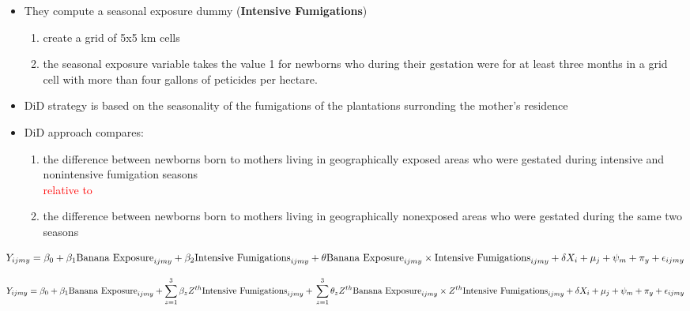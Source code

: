 \documentclass[hyperref={pdfpagelabels=false}]{beamer}
\begin{document}
	\begin{frame}{}
		\begin{itemize}
			\justifying
			\item They compute a seasonal exposure dummy (\textcolor{myblue}{\textbf{Intensive Fumigations}})
			\begin{enumerate}
				\justifying
				\item create a grid of 5x5 km cells
				\item the seasonal exposure variable takes the value 1 for newborns who during their gestation were for at least three months in a grid cell with more than four gallons of peticides per hectare.
			\end{enumerate}
			\item DiD strategy is based on the seasonality of the fumigations of the plantations surronding the mother's residence
			\vspace{2mm}
			\item DiD approach compares:
			\begin{enumerate}
				\justifying
				\item  the difference between newborns born to mothers living in geographically exposed areas who were gestated during intensive and nonintensive fumigation seasons \\
				\textcolor{red}{relative to}
				\item the difference between newborns born to mothers living in geographically nonexposed areas who were gestated during the same two seasons
			\end{enumerate}
		\end{itemize}
	\end{frame}
	
	\begin{frame}{}
		\begin{equation}
			Y_{ijmy} = \beta_{0} + \beta_{1}\text{Banana Exposure}_{ijmy} + \beta_{2}\text{Intensive Fumigations}_{ijmy} + \\ \theta \text{Banana Exposure}_{ijmy} \times \text{Intensive Fumigations}_{ijmy} + \\ \vspace{2mm} \delta X_{i} + \mu_{j} + \psi_{m} + \pi_{y} + \epsilon_{ijmy} 
		\end{equation}
		
		\vspace{4mm}
		
		
		\hline
		
		
		\begin{equation}
			Y_{ijmy} = \beta_{0} + \beta_{1}\text{Banana Exposure}_{ijmy} + \sum_{z=1}^{3} \beta_{z} Z^{th}\text{Intensive Fumigations}_{ijmy} + \\  \sum_{z=1}^{3} \theta_{z} Z^{th}\text{Banana Exposure}_{ijmy} \times   Z^{th}\text{Intensive Fumigations}_{ijmy} + \\  \vspace{2mm} \delta X_{i} + \mu_{j} + \psi_{m} + \pi_{y} + \epsilon_{ijmy} 
		\end{equation}
		
		
	\end{frame}
	
\end{document}
